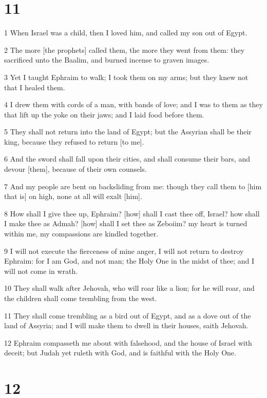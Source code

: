 \chapter{11}

\par 1 When Israel was a child, then I loved him, and called my son out of Egypt.
\par 2 The more [the prophets] called them, the more they went from them: they sacrificed unto the Baalim, and burned incense to graven images.
\par 3 Yet I taught Ephraim to walk; I took them on my arms; but they knew not that I healed them.
\par 4 I drew them with cords of a man, with bands of love; and I was to them as they that lift up the yoke on their jaws; and I laid food before them.
\par 5 They shall not return into the land of Egypt; but the Assyrian shall be their king, because they refused to return [to me].
\par 6 And the sword shall fall upon their cities, and shall consume their bars, and devour [them], because of their own counsels.
\par 7 And my people are bent on backsliding from me: though they call them to [him that is] on high, none at all will exalt [him].
\par 8 How shall I give thee up, Ephraim? [how] shall I cast thee off, Israel? how shall I make thee as Admah? [how] shall I set thee as Zeboiim? my heart is turned within me, my compassions are kindled together.
\par 9 I will not execute the fierceness of mine anger, I will not return to destroy Ephraim: for I am God, and not man; the Holy One in the midst of thee; and I will not come in wrath.
\par 10 They shall walk after Jehovah, who will roar like a lion; for he will roar, and the children shall come trembling from the west.
\par 11 They shall come trembling as a bird out of Egypt, and as a dove out of the land of Assyria; and I will make them to dwell in their houses, saith Jehovah.
\par 12 Ephraim compasseth me about with falsehood, and the house of Israel with deceit; but Judah yet ruleth with God, and is faithful with the Holy One.

\chapter{12}

